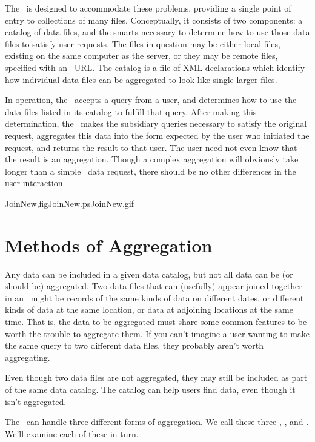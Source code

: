 \documentclass{dods-book}
\begin{document}
The \AggServer\ is designed to accommodate these problems, providing a
single point of entry to collections of many files.  Conceptually, it
consists of two components: a catalog of data files, and the smarts
necessary to determine how to use those data files to satisfy user
requests.  The files in question may be either local files, existing
on the same computer as the server, or they may be remote files,
specified with an \opendap\ URL.  The catalog is a file of XML
declarations which identify how individual data files can be aggregated
to look like single larger files.

In operation, the \aggser\ accepts a query from a user, and determines
how to use the data files listed in its catalog to fulfill that query.
After making this determination, the \aggser\ makes the subsidiary
queries necessary to satisfy the original request, aggregates this
data into the form expected by the user who initiated the request, and
returns the result to that user.  The user need not even know that the
result is an aggregation.  Though a complex aggregation will obviously
take longer than a simple \opendap\ data request, there should be no
other differences in the user interaction.

{JoinNew,fig}{JoinNew.ps}{JoinNew.gif}{}

\section{Methods of Aggregation}

Any data can be included in a given data catalog, but not all data can
be (or should be) aggregated.  Two data files that can (usefully)
appear joined together in an \aggser\ might be records of the same kinds of
data on different dates, or different kinds of data at the same
location, or data at adjoining locations at the same time.  That is,
the data to be aggregated must share some common features to be worth
the trouble to aggregate them.  If you can't imagine a user wanting to
make the same query to two different data files, they probably aren't
worth aggregating.

Even though two data files are not aggregated, they may still be
included as part of the same data catalog.  The catalog can help users
find data, even though it isn't aggregated.

The \AggServer\ can handle three different forms of aggregation.  We
call these three , , and .
We'll examine each of these in turn.  
\end{document}
